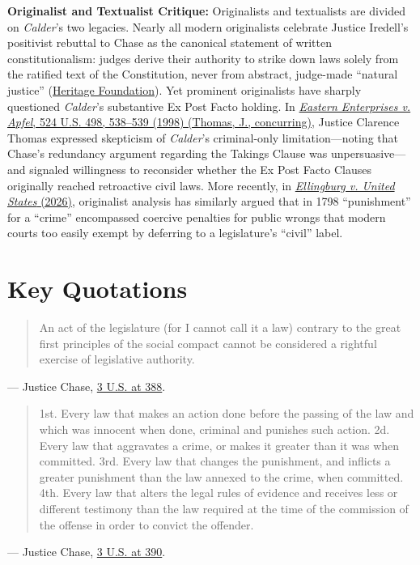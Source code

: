 \documentclass[12pt]{article}
\begin{document}
\textbf{Originalist and Textualist Critique:} Originalists and textualists are divided on \textit{Calder}'s two legacies. Nearly all modern originalists celebrate Justice Iredell's positivist rebuttal to Chase as the canonical statement of written constitutionalism: judges derive their authority to strike down laws solely from the ratified text of the Constitution, never from abstract, judge-made ``natural justice'' (\href{https://www.heritage.org/courts/report/judicial-supremacy-and-our-two-constitutions-reflections-the-historical-record}{Heritage Foundation}). Yet prominent originalists have sharply questioned \textit{Calder}'s substantive Ex Post Facto holding. In \href{https://www.law.cornell.edu/supct/html/97-42.ZC.html}{\textit{Eastern Enterprises v. Apfel}, 524 U.S. 498, 538--539 (1998) (Thomas, J., concurring)}, Justice Clarence Thomas expressed skepticism of \textit{Calder}'s criminal-only limitation---noting that Chase's redundancy argument regarding the Takings Clause was unpersuasive---and signaled willingness to reconsider whether the Ex Post Facto Clauses originally reached retroactive civil laws. More recently, in \href{https://www.supremecourt.gov/opinions/25pdf/24-482_d1oe.pdf}{\textit{Ellingburg v. United States} (2026)}, originalist analysis has similarly argued that in 1798 ``punishment'' for a ``crime'' encompassed coercive penalties for public wrongs that modern courts too easily exempt by deferring to a legislature's ``civil'' label.

\section{Key Quotations}

\begin{quote}
An act of the legislature (for I cannot call it a law) contrary to the great first principles of the social compact cannot be considered a rightful exercise of legislative authority.
\end{quote}
\noindent --- Justice Chase, \href{https://supreme.justia.com/cases/federal/us/3/386/}{3 U.S. at 388}.

\begin{quote}
1st. Every law that makes an action done before the passing of the law and which was innocent when done, criminal and punishes such action. 2d. Every law that aggravates a crime, or makes it greater than it was when committed. 3rd. Every law that changes the punishment, and inflicts a greater punishment than the law annexed to the crime, when committed. 4th. Every law that alters the legal rules of evidence and receives less or different testimony than the law required at the time of the commission of the offense in order to convict the offender.
\end{quote}
\noindent --- Justice Chase, \href{https://supreme.justia.com/cases/federal/us/3/386/}{3 U.S. at 390}.
\end{document}
